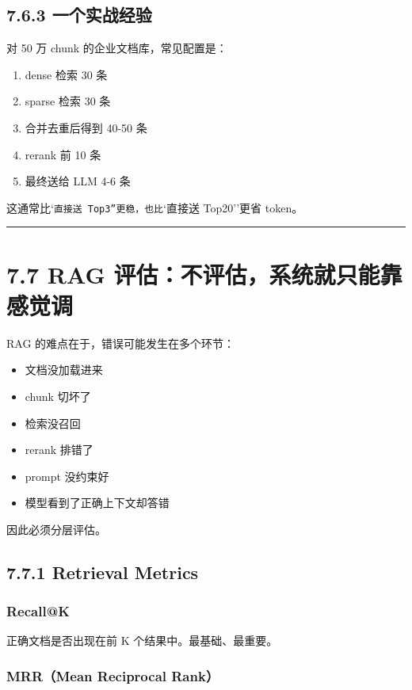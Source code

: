 \subsection{7.6.3 一个实战经验}

对 50 万 chunk 的企业文档库，常见配置是：


\begin{enumerate}[leftmargin=2em]
\item dense 检索 30 条
\item sparse 检索 30 条
\item 合并去重后得到 40-50 条
\item rerank 前 10 条
\item 最终送给 LLM 4-6 条
\end{enumerate}

这通常比`\texttt{直接送 Top3''更稳，也比}`直接送 Top20''更省 token。


\bigskip\hrule\bigskip

\section{7.7 RAG 评估：不评估，系统就只能靠感觉调}

RAG 的难点在于，错误可能发生在多个环节：


\begin{itemize}[leftmargin=2em]
\item 文档没加载进来
\item chunk 切坏了
\item 检索没召回
\item rerank 排错了
\item prompt 没约束好
\item 模型看到了正确上下文却答错
\end{itemize}

因此必须分层评估。


\subsection{7.7.1 Retrieval Metrics}

\subsubsection{Recall@K}

正确文档是否出现在前 K 个结果中。最基础、最重要。


\subsubsection{MRR（Mean Reciprocal Rank）}

